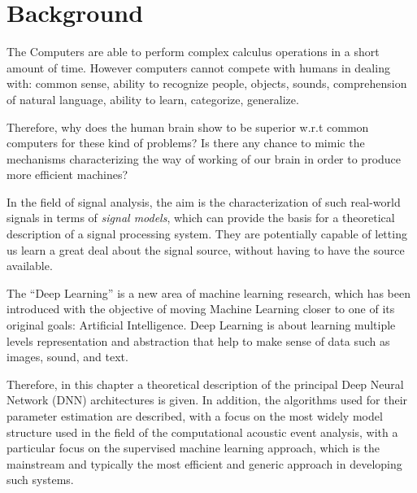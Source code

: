 \chapter{Background}\label{ch:backg}

The Computers are able to perform complex calculus operations in a short amount of time.
However computers cannot compete with humans in dealing with: common sense, ability to recognize people, objects, sounds, comprehension of natural language, ability to learn, categorize, generalize.

Therefore, why does the human brain show to be superior w.r.t common computers for these kind of problems?
Is there any chance to mimic the mechanisms characterizing the way of working of our brain in order to produce more efficient machines?

In the field of signal analysis, the aim is the characterization of such real-world signals in terms of \textit{signal models}, which can provide the basis for a theoretical description of a signal processing system. They are potentially capable of letting us learn a great deal about the signal source, without having to have the source available.

The ``Deep Learning'' is a new area of machine learning research, which has been introduced with the objective of moving Machine Learning closer to one of its original goals: Artificial Intelligence. Deep Learning is about learning multiple levels representation and abstraction that help to make sense of data such as images, sound, and text.

Therefore, in this chapter a theoretical description of the principal Deep Neural Network (DNN) architectures is given. In addition, the algorithms used for their parameter estimation are described, with a focus on the most widely model structure used in the field of the computational acoustic event analysis, with a particular focus on the supervised machine
learning approach, which is the mainstream and
typically the most efficient and generic approach in developing such systems. 





